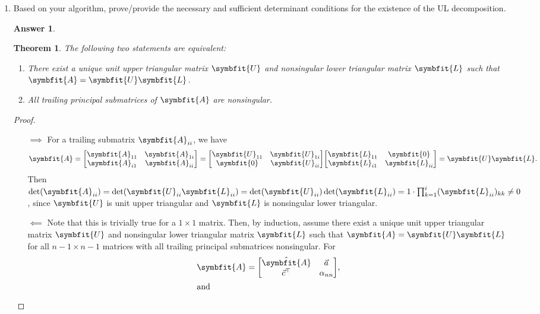 \documentclass{article}
\newtheorem{theorem}{Theorem}
\theoremstyle{definition}
\newtheorem*{answer}{Answer}
\newcommand{\mat}[1]{\symbfit{#1}}
\begin{document}
\begin{enumerate}[leftmargin=\labelsep]
\begin{enumerate}
		      \item Based on your algorithm, prove/provide the necessary and sufficient determinant conditions for the existence of the UL decomposition.
		            \begin{answer}
			            \begin{theorem}
				            The following two statements are equivalent:
				            \begin{enumerate}
					            \item There exist a unique unit upper triangular matrix \(\mat{U}\) and nonsingular lower triangular matrix \(\mat{L}\) such that \(\mat{A} = \mat{U}\mat{L}\).
					            \item All trailing principal submatrices of \(\mat{A}\) are nonsingular.
				            \end{enumerate}
			            \end{theorem}
			            \begin{proof}\hfill
				            \begin{itemize}
					            \item[\(\implies\)] For a trailing submatrix \(\mat{A}_{ii}\), we have
					                  \[
						                  \mat{A} = \mqty[\mat{A}_{11}&\mat{A}_{1i}\\\mat{A}_{i1}&\mat{A}_{ii}] = \mqty[\mat{U}_{11}&\mat{U}_{1i}\\\mat{0}&\mat{U}_{ii}] \mqty[\mat{L}_{11}&\mat{0}\\\mat{L}_{i1}&\mat{L}_{ii}] = \mat{U}\mat{L}.
					                  \]
					                  Then \(\det(\mat{A}_{ii}) = \det(\mat{U}_{ii}\mat{L}_{ii}) = \det(\mat{U}_{ii})\det(\mat{L}_{ii}) = 1 \cdot \prod_{k=1}^i (\mat{L}_{ii})_{kk} \neq 0\), since \(\mat{U}\) is unit upper triangular and \(\mat{L}\) is nonsingular lower triangular.
					            \item[\(\impliedby\)] Note that this is trivially true for a \(1 \times 1\) matrix. Then, by induction, assume there exist a unique unit upper triangular matrix \(\mat{U}\) and nonsingular lower triangular matrix \(\mat{L}\) such that \(\mat{A} = \mat{U}\mat{L}\) for all \(n-1 \times n-1\) matrices with all trailing principal submatrices nonsingular. For
					                  \begin{align*}
						                  \mat{A}       & = \mqty[\hat{\mat{A}} & \vec{a} \\\vec{c}^\top&\alpha_{nn}],\\
						                  \shortintertext{and}

\end{align*}
\end{itemize}
\end{proof}
\end{answer}
\end{enumerate}
\end{enumerate}
\end{document}
